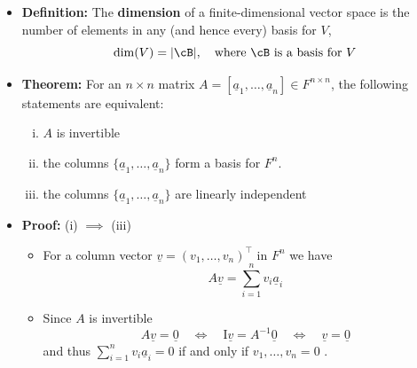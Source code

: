 \documentclass[11pt,twoside]{report}
\newcommand{\vecnot}{\underline}
\newcommand{\Id}{{\mathrm{I}}}
\begin{document}
\begin{itemize}

\item \textbf{Definition:} The \textbf{dimension} of a finite-dimensional vector space is the number of elements in any (and hence every) basis for $V$,
\[
\dim(V) = |\cB|, \quad \text{where $\cB$ is a basis for $V$}
\]






\item \textbf{Theorem:} For an $n \times n$ matrix $A = [ \vecnot{a}_1, \dots, \vecnot{a}_n] \in F^{n \times n}$, the following statements are equivalent:
\begin{enumerate}[(i)]
\item $A$ is invertible
\item the columns $\{\vecnot{a}_1, \dots, \vecnot{a}_n\}$ form a basis for $F^n$. 
\item the columns $\{\vecnot{a}_1, \dots, \vecnot{a}_n\}$ are linearly independent 
\end{enumerate}





\item \textbf{Proof:} (i) $\implies$ (iii)
\begin{itemize}
\item For a column vector $\vecnot{v}  =(v_1, \dots, v_n)^\top$ in $F^{n}$ we have
\[
A \vecnot{v} = \sum_{i=1}^n v_i \vecnot{a}_i
\]
\item Since $A$ is invertible
\[
A \vecnot{v} = \vecnot{0}  \quad \iff \quad \Id \vecnot{v}  = A^{-1} \vecnot{0}  \quad \iff \quad \vecnot{v}= \vecnot{0}
\]
and thus $\sum_{i=1}^n v_i \vecnot{a}_i = 0$ if and only if $v_1, \dots, v_n = 0$ .
\end{itemize}



\end{itemize}
\end{document}
